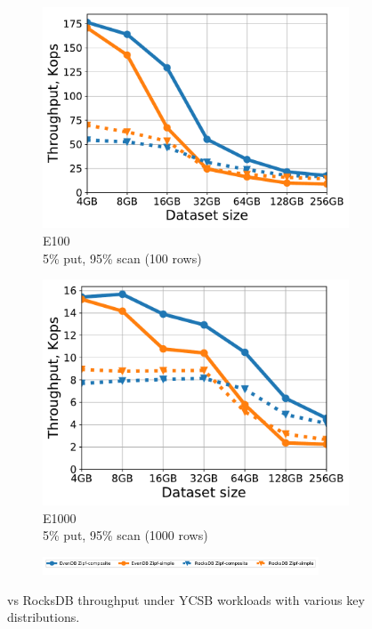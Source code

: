 \begin{figure}[tb]
\begin{subfigure}{0.3\linewidth}
\includegraphics[width=\textwidth]{figs/Workload_E_line.pdf}
\caption{E100 \\ 5\% put, 95\% scan (100 rows)}
\label{fig:throughput:e100}
\end{subfigure}
\begin{subfigure}{0.3\linewidth}
\includegraphics[width=\textwidth]{figs/Workload_E+_line.pdf}
\caption{E1000 \\5\% put, 95\% scan (1000 rows)}
\label{fig:throughput:e1000}
\end{subfigure}
\begin{subfigure}{\linewidth}
\centerline{
\includegraphics[width=0.9\textwidth]{figs/legend.pdf}
\vspace{-5mm}
}
\end{subfigure}
\caption{
{\sys\/ vs RocksDB throughput under YCSB workloads with various key distributions.}
}
\label{fig:throughput}
\end{figure}

